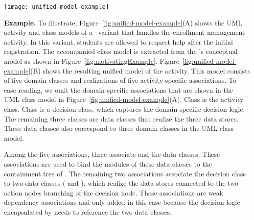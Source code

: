 \begin{figure*}[ht]
	\begin{center}
		\texttt{[image: unified-model-example]}
	\end{center}
	\caption{(A: Left) The UML activity and class models of a \courseman~software variant that handles the enrollment management activity; (B: Right) The unified model that results.} %
	\label{fig:unified-model-example}
\end{figure*} 

\noindent\textbf{Example.} To illustrate, Figure~\ref{fig:unified-model-example}(A) shows the UML activity and class models of a \courseman~variant that handles the enrollment management activity. In this variant, students are allowed to request help after the initial registration. The accompanied class model is extracted from the \courseman's conceptual model as shown in Figure~\ref{fig:motivatingExample}.
%
Figure~\ref{fig:unified-model-example}(B) shows the resulting unified model of the activity.
This model consists of five domain classes and realizations of five activity-specific associations. To ease reading, we omit the domain-specific associations that are shown in the UML class model in Figure~\ref{fig:unified-model-example}(A). Class  is the activity class. Class  is a decision class, which captures the domain-specific decision logic. The remaining three classes are data classes that realize the three data stores. These data classes also correspond to three domain classes in the UML class model. 

Among the five associations, three associate  and the data classes. These associations are used to bind the modules of these data classes to the containment tree of .
The remaining two associations associate the decision class  to two data classes ( and ), which realize the data stores connected to the two action nodes branching of the decision node. These associations are weak dependency associations and only added in this case because the decision logic encapsulated by  needs to reference the two data classes.
%
